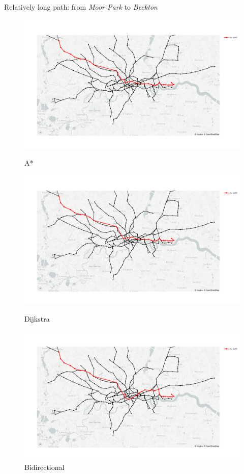 \documentclass{article}
\begin{document}
	Relatively long path: from \textit{Moor Park} to \textit{Beckton}
	\begin{figure}[H]
		\begin{minipage}{0.32\textwidth}
			\includegraphics[width=\linewidth]{(long)_Astar.png}
			\caption{A*}
		\end{minipage}\hfill
		\begin{minipage}{0.32\textwidth}
			\includegraphics[width=\linewidth]{(long)_Dijkstra.png}
			\caption{Dijkstra}
		\end{minipage}\hfill
		\begin{minipage}{0.32\textwidth}
			\includegraphics[width=\linewidth]{(long)_Bidirectional.png}
			\caption{Bidirectional}
		\end{minipage}
	\end{figure}
	 
\end{document}
